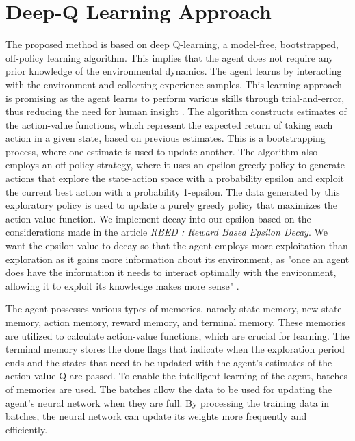 \documentclass[letterpaper]{article} %
\begin{document}
\section{Deep-Q Learning Approach}

The proposed method is based on deep Q-learning, a model-free, bootstrapped, off-policy learning algorithm. This implies that the agent does not require any prior knowledge of the environmental dynamics. The agent learns by interacting with the environment and collecting experience samples. This learning approach is promising as the agent learns to perform various skills through trial-and-error, thus reducing the need for human insight \cite{2018-TOG-deepMimic}. The algorithm constructs estimates of the action-value functions, which represent the expected return of taking each action in a given state, based on previous estimates. This is a bootstrapping process, where one estimate is used to update another. The algorithm also employs an off-policy strategy, where it uses an epsilon-greedy policy to generate actions that explore the state-action space with a probability epsilon and exploit the current best action with a probability 1-epsilon. The data generated by this exploratory policy is used to update a purely greedy policy that maximizes the action-value function. We implement decay into our epsilon based on the considerations made in the article \textit{RBED : Reward Based Epsilon Decay}. We want the epsilon value to decay so that the agent employs more exploitation than exploration as it gains more information about its environment, as "once an agent does have the information it
needs to interact optimally with the environment, allowing it to exploit its knowledge makes more sense" \cite{maroti_2019_rbed}.  

\par The agent possesses various types of memories, namely state memory, new state memory, action memory, reward memory, and terminal memory. These memories are utilized to calculate action-value functions, which are crucial for learning. The terminal memory stores the done flags that indicate when the exploration period ends and the states that need to be updated with the agent's estimates of the action-value Q are passed. To enable the intelligent learning of the agent, batches of memories are used. The batches allow the data to be used for updating the agent's neural network when they are full. By processing the training data in batches, the neural network can update its weights more frequently and efficiently.
\end{document}
